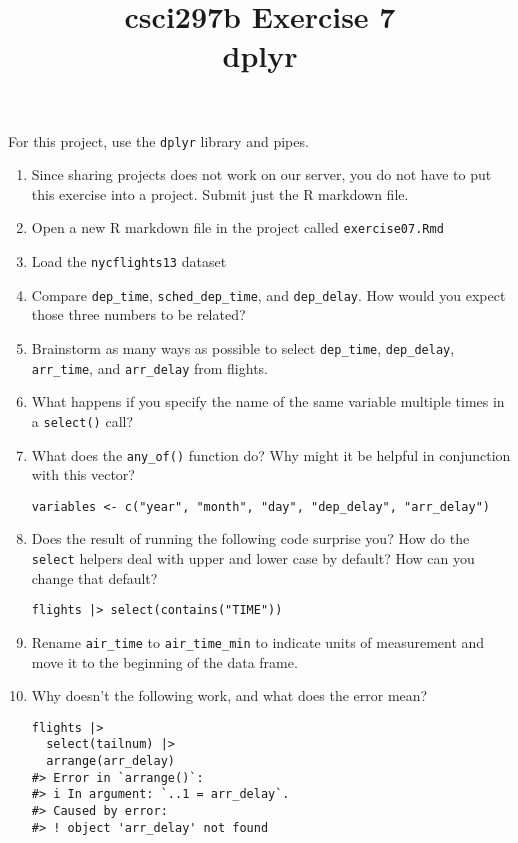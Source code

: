 \documentclass[12pt]{article}
\title{csci297b Exercise 7\\dplyr
  }
\date{}
\begin{document}
\maketitle

For this project, use the {\tt dplyr} library and pipes.

\begin{enumerate}

\item Since sharing projects does not work
on our server, you do not have to put this exercise into a project.
Submit just the R markdown file.


\item Open a new R markdown file in the project called \verb|exercise07.Rmd|

\item Load the {\tt nycflights13} dataset

\item  Compare \verb|dep_time|, 
\verb|sched_dep_time|, and 
\verb|dep_delay|. How would you expect those three numbers to be related?

\item
Brainstorm as many ways as possible to select \verb|dep_time|, 
\verb|dep_delay|, \verb|arr_time|, and \verb|arr_delay| from flights.

\item

What happens if you specify the name of the same variable multiple times in a 
\verb|select()| call?

\item
What does the \verb|any_of()| function do? Why might it be helpful in conjunction with this vector?
\begin{verbatim}
variables <- c("year", "month", "day", "dep_delay", "arr_delay")
\end{verbatim}

\item
Does the result of running the following code surprise you? How do the \verb|select|
helpers deal with upper and lower case by default? How can you change that default?

\begin{verbatim}
flights |> select(contains("TIME"))
\end{verbatim}

\item
Rename \verb|air_time| to \verb|air_time_min| to indicate units of measurement and move it to the beginning of the data frame.

\item

Why doesn’t the following work, and what does the error mean?
\begin{verbatim}
flights |> 
  select(tailnum) |> 
  arrange(arr_delay)
#> Error in `arrange()`:
#> i In argument: `..1 = arr_delay`.
#> Caused by error:
#> ! object 'arr_delay' not found
\end{verbatim}

\end{enumerate}
\end{document}

